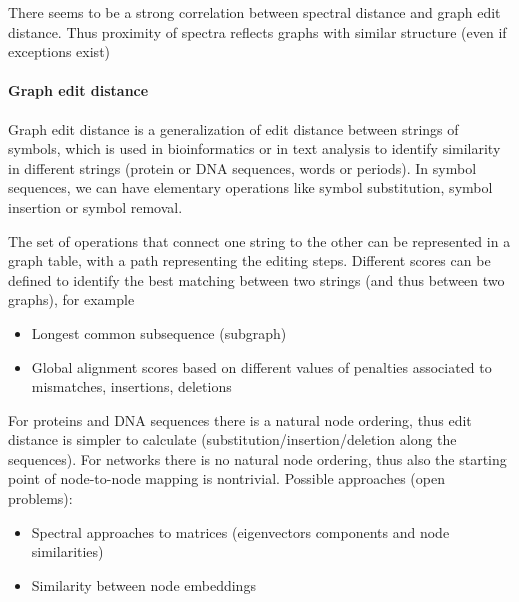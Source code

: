 There seems to be a strong correlation between spectral distance and graph edit distance. Thus proximity of spectra reflects graphs with similar structure (even if exceptions exist) 

\paragraph{Graph edit distance}
Graph edit distance is a generalization of edit distance between strings of symbols, which is used in bioinformatics or in text analysis to identify similarity in different strings (protein or DNA sequences, words or periods).
In symbol sequences, we can have elementary operations like symbol substitution, symbol insertion or symbol removal.

The set of operations that connect one string to the other can be represented in a graph table, with a path representing the editing steps. Different scores can be defined to identify the best matching between two strings (and thus between two graphs), for example
\begin{itemize}
    \item Longest common subsequence (subgraph)
    \item Global alignment scores based on different values of penalties associated to mismatches, insertions, deletions
\end{itemize}

\begin{example}
    For proteins and DNA sequences there is a natural node ordering, thus edit distance is simpler to calculate (substitution/insertion/deletion along the sequences).
    For networks there is no natural node ordering, thus also the starting point of node-to-node mapping is nontrivial. Possible approaches (open problems):
    \begin{itemize}
        \item Spectral approaches to matrices (eigenvectors components and node similarities)
        \item Similarity between node embeddings
    \end{itemize}

\end{example}